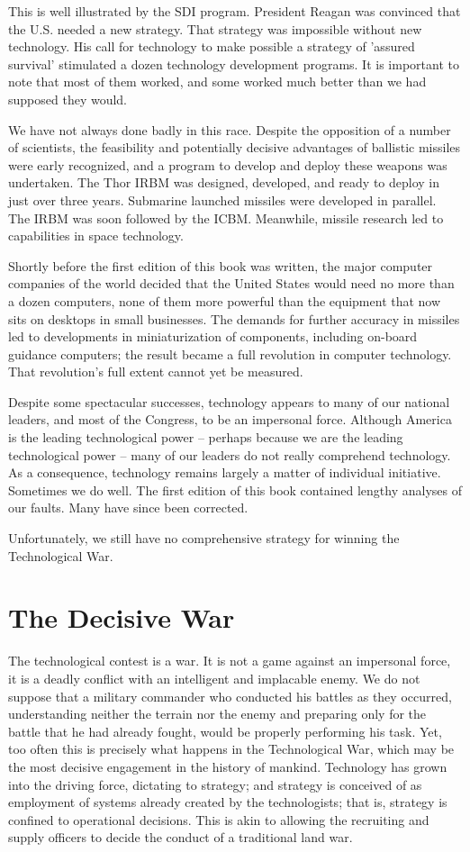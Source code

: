 This is well illustrated by the SDI program. President Reagan was convinced that the U.S. needed a new strategy. That strategy was impossible without new technology. His call for technology to make possible a strategy of 'assured survival' stimulated a dozen technology development programs. It is important to note that most of them worked, and some worked much better than we had supposed they would.

We have not always done badly in this race. Despite the opposition of a number of scientists, the feasibility and potentially decisive advantages of ballistic missiles were early recognized, and a program to develop and deploy these weapons was undertaken. The Thor IRBM was designed, developed, and ready to deploy in just over three years. Submarine launched missiles were developed in parallel. The IRBM was soon followed by the ICBM. Meanwhile, missile research led to capabilities in space technology.

Shortly before the first edition of this book was written, the major computer companies of the world decided that the United States would need no more than a dozen computers, none of them more powerful than the equipment that now sits on desktops in small businesses. The demands for further accuracy in missiles led to developments in miniaturization of components, including on-board guidance computers; the result became a full revolution in computer technology. That revolution's full extent cannot yet be measured.

Despite some spectacular successes, technology appears to many of our national leaders, and most of the Congress, to be an impersonal force. Although America is the leading technological power -- perhaps because we are the leading technological power -- many of our leaders do not really comprehend technology. As a consequence, technology remains largely a matter of individual initiative. Sometimes we do well. The first edition of this book contained lengthy analyses of our faults. Many have since been corrected.

Unfortunately, we still have no comprehensive strategy for winning the Technological War.

\section{The Decisive War}
The technological contest is a war. It is not a game against an impersonal force, it is a deadly conflict with an intelligent and implacable enemy. We do not suppose that a military commander who conducted his battles as they occurred, understanding neither the terrain nor the enemy and preparing only for the battle that he had already fought, would be properly performing his task. Yet, too often this is precisely what happens in the Technological War, which may be the most decisive engagement in the history of mankind. Technology has grown into the driving force, dictating to strategy; and strategy is conceived of as employment of systems already created by the technologists; that is, strategy is confined to operational decisions. This is akin to allowing the recruiting and supply officers to decide the conduct of a traditional land war.

